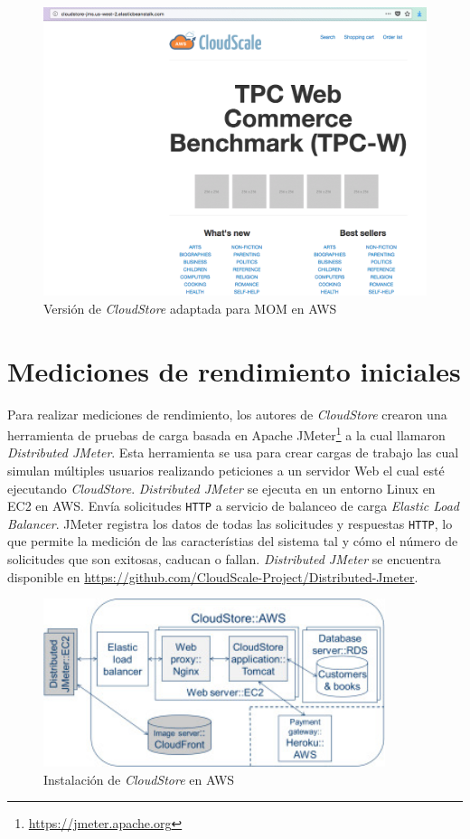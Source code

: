 \documentclass[11pt, twoside]{report}
\begin{document}
\begin{figure}[h]
  \centering
  \includegraphics[width=14cm]{aws-cs-jms}
  \caption{\small{Versión de \emph{CloudStore} adaptada para MOM en AWS}}
  \label{fig:aws-cs-jms}
\end{figure}


\section{Mediciones de rendimiento iniciales} \label{ch:mediciones-iniciales}
Para realizar mediciones de rendimiento, los autores de \emph{CloudStore} crearon una herramienta de pruebas de carga basada en Apache JMeter\footnote{\url{https://jmeter.apache.org}} a la cual llamaron \emph{Distributed JMeter}. Esta herramienta se usa para crear cargas de trabajo las cual simulan múltiples usuarios realizando peticiones a un servidor Web el cual esté ejecutando \emph{CloudStore}. \emph{Distributed JMeter} se ejecuta en un entorno Linux en EC2 en AWS. Envía solicitudes \texttt{HTTP} a servicio de balanceo de carga \emph{Elastic Load Balancer}. JMeter registra los datos de todas las solicitudes y respuestas \texttt{HTTP}, lo que permite la medición de las característias del sistema tal y cómo el número de solicitudes que son exitosas, caducan o fallan. \emph{Distributed JMeter} se encuentra disponible en \url{https://github.com/CloudScale-Project/Distributed-Jmeter}. 

\begin{figure}[h]
  \centering
  \includegraphics[width=10cm]{cloudstore-deployment}
  \caption{\small{Instalación de \emph{CloudStore} en AWS}}
  \label{fig:cs-deploy}
\end{figure}
\end{document}
